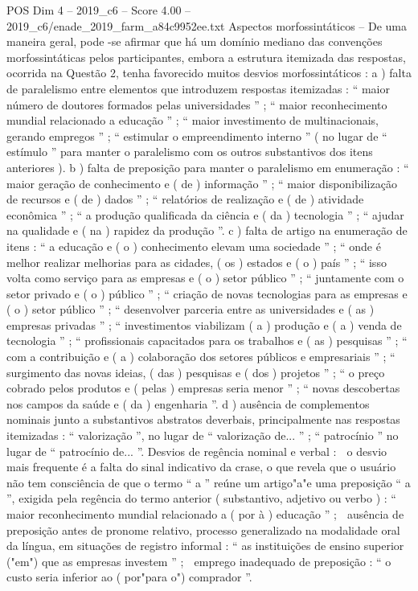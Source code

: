 \begin{textsample}{POS Dim 4 – 2019\_c6 – Score 4.00 – 2019\_c6/enade\_2019\_farm\_a84c9952ee.txt}
Aspectos morfossintáticos – De uma maneira geral, pode -se afirmar que há um domínio mediano das convenções morfossintáticas pelos participantes, embora a estrutura itemizada das respostas, ocorrida na Questão 2, tenha favorecido muitos desvios morfossintáticos : a ) falta de paralelismo entre elementos que introduzem respostas itemizadas : “ maior número de doutores formados pelas universidades ” ; “ maior reconhecimento mundial relacionado a educação ” ; “ maior investimento de multinacionais, gerando empregos ” ; “ estimular o empreendimento interno ” ( no lugar de “ estímulo ” para manter o paralelismo com os outros substantivos dos itens anteriores ). b ) falta de preposição para manter o paralelismo em enumeração : “ maior geração de conhecimento e ( de ) informação ” ; “ maior disponibilização de recursos e ( de ) dados ” ; “ relatórios de realização e ( de ) atividade econômica ” ; “ a produção qualificada da ciência e ( da ) tecnologia ” ; “ ajudar na qualidade e ( na ) rapidez da produção ”. c ) falta de artigo na enumeração de itens : “ a educação e ( o ) conhecimento elevam uma sociedade ” ; “ onde é melhor realizar melhorias para as cidades, ( os ) estados e ( o ) país ” ; “ isso volta como serviço para as empresas e ( o ) setor público ” ; “ juntamente com o setor privado e ( o ) público ” ; “ criação de novas tecnologias para as empresas e ( o ) setor público ” ; “ desenvolver parceria entre as universidades e ( as ) empresas privadas ” ; “ investimentos viabilizam ( a ) produção e ( a ) venda de tecnologia ” ; “ profissionais capacitados para os trabalhos e ( as ) pesquisas ” ; “ com a contribuição e ( a ) colaboração dos setores públicos e empresariais ” ; “ surgimento das novas ideias, ( das ) pesquisas e ( dos ) projetos ” ; “ o preço cobrado pelos produtos e ( pelas ) empresas seria menor ” ; “ novas descobertas nos campos da saúde e ( da ) engenharia ”. d ) ausência de complementos nominais junto a substantivos abstratos deverbais, principalmente nas respostas itemizadas : “ valorização ”, no lugar de “ valorização de... ” ; “ patrocínio ” no lugar de “ patrocínio de... ”.
Desvios de regência nominal e verbal :  o desvio mais frequente é a falta do sinal indicativo da crase, o que revela que o usuário não tem consciência de que o termo “ a ” reúne um artigo"a"e uma preposição “ a ”, exigida pela regência do termo anterior ( substantivo, adjetivo ou verbo ) : “ maior reconhecimento mundial relacionado a ( por à ) educação ” ;  ausência de preposição antes de pronome relativo, processo generalizado na modalidade oral da língua, em situações de registro informal : “ as instituições de ensino superior ("em") que as empresas investem ” ;  emprego inadequado de preposição : “ o custo seria inferior ao ( por"para o") comprador ”.

\end{textsample}
